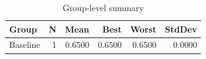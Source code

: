 \begin{table}[htbp]
\centering
\caption{Group-level summary}
\label{tab:group-summary}
\begin{tabular}{lrrrrr}
\toprule
\textbf{Group} & \textbf{N} & \textbf{Mean} & \textbf{Best} & \textbf{Worst} & \textbf{StdDev} \\
\midrule
Baseline & 1 & 0.6500 & 0.6500 & 0.6500 & 0.0000 \\
\bottomrule
\end{tabular}
\end{table}
